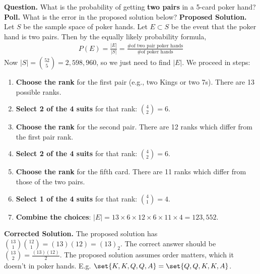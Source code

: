 \documentclass[10pt]{beamer}
\begin{document}
\begin{frame}
\footnotesize 



 \colorbox{red!30}{\textbf{Question.}}  What is the probability of getting \textbf{two pairs} in a 5-card poker hand?
 \vfill 
  \colorbox{yellow!30}{\textbf{Poll.}} What is the error in the proposed solution below?
 \vfill 
 \pause 
 \colorbox{blue!30}{\textbf{Proposed Solution.}} Let $S$ be the sample space of poker hands. 
Let $E \subset S$ be the event that the poker hand is two pairs. Then by the equally likely probability formula, 
\begin{align*}
P(E) = 	\frac{|E|}{|S|} = \frac{\text{\# of two pair poker hands}}{\text{\# of poker hands}}
\end{align*}
Now $|S|=\binom{52}{5} =  2,598,960$, so we just need to find $|E|$.  We proceed in steps:

\begin{enumerate} \footnotesize 
\item \textbf{Choose the rank} for the first pair 	(e.g., two Kings or two 7s).  There are 13 possible ranks.
\item \textbf{Select 2 of the 4 suits} for that rank:  $\binom{4}{2}=6$.
\item \textbf{Choose the rank} for the second pair.  There are 12 ranks which differ from the first pair rank.
\item \textbf{Select 2 of the 4 suits} for that rank:  $\binom{4}{2}=6$.
\item \textbf{Choose the rank} for the fifth card.  There are 11 ranks which differ from those of the two pairs.
\item \textbf{Select 1 of the 4 suits} for that rank:  $\binom{4}{1}=4$.
\item \textbf{Combine the choices}:  $|E|=13 \times 6 \times 12 \times 6 \times 11 \times 4 = 123,552$.
\end{enumerate}
\vspace{-.1cm}
\pause 
 \colorbox{green!30}{\textbf{Corrected Solution.}} The proposed solution has $\binom{13}{1} \binom{12}{1} = (13)(12) = (13)_2$.   The correct answer should be $\binom{13}{2} = \frac{(13)(12)}{2}$.  The proposed solution assumes order matters, which it doesn't in poker hands.  E.g. $\set{K,K,Q,Q,A} = \set{Q,Q,K,K,A}$.   
\end{frame}
\end{document}
